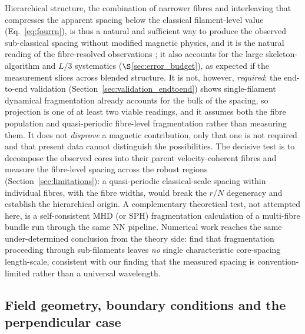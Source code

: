\documentclass[usenatbib,twoside,twocolumn]{mnras}
\begin{document}
Hierarchical structure, the combination of narrower fibres and interleaving that compresses the apparent spacing below the classical filament-level value (Eq.~\ref{eq:fourrn}), is thus a natural and sufficient way to produce the observed sub-classical spacing without modified magnetic physics, and it is the natural reading of the fibre-resolved observations \citep{Yang2024,Hacar2013}; it also accounts for the large skeleton-algorithm and $L/3$ systematics ($\S$\ref{sec:error_budget}), as expected if the measurement slices across blended structure. It is not, however, \emph{required}: the end-to-end validation (Section~\ref{sec:validation_endtoend}) shows single-filament dynamical fragmentation already accounts for the bulk of the spacing, so projection is one of at least two viable readings, and it assumes both the fibre population and quasi-periodic fibre-level fragmentation rather than measuring them. It does not \emph{disprove} a magnetic contribution, only that one is not required and that present data cannot distinguish the possibilities. The decisive test is to decompose the observed cores into their parent velocity-coherent fibres and measure the fibre-level spacing across the robust regions (Section~\ref{sec:limitations}): a quasi-periodic classical-scale spacing within individual fibres, with the fibre widths, would break the $r/N$ degeneracy and establish the hierarchical origin. A complementary theoretical test, not attempted here, is a self-consistent MHD (or SPH) fragmentation calculation of a multi-fibre bundle run through the same NN pipeline. Numerical work reaches the same under-determined conclusion from the theory side: \citet{Clarke2020} find that fragmentation proceeding through sub-filaments leaves \emph{no} single characteristic core-spacing length-scale, consistent with our finding that the measured spacing is convention-limited rather than a universal wavelength.



\subsection{Field geometry, boundary conditions and the perpendicular case}
\label{sec:why_mhd_fails}
\end{document}
